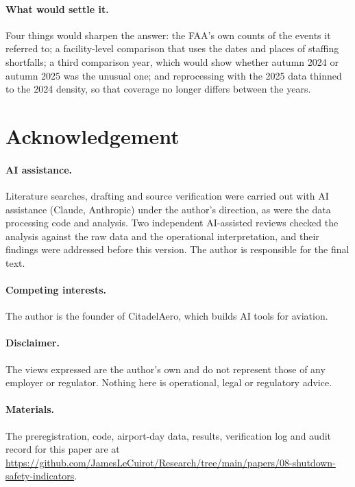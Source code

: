 \documentclass[11pt]{article}
\begin{document}
\paragraph{What would settle it.} Four things would sharpen the answer: the FAA's own counts of the events it referred to; a facility-level comparison that uses the dates and places of staffing shortfalls; a third comparison year, which would show whether autumn 2024 or autumn 2025 was the unusual one; and reprocessing with the 2025 data thinned to the 2024 density, so that coverage no longer differs between the years.

\section*{Acknowledgement}
\paragraph{AI assistance.} Literature searches, drafting and source verification were carried out with AI assistance (Claude, Anthropic) under the author's direction, as were the data processing code and analysis. Two independent AI-assisted reviews checked the analysis against the raw data and the operational interpretation, and their findings were addressed before this version. The author is responsible for the final text.
\paragraph{Competing interests.} The author is the founder of CitadelAero, which builds AI tools for aviation.
\paragraph{Disclaimer.} The views expressed are the author's own and do not represent those of any employer or regulator. Nothing here is operational, legal or regulatory advice.
\paragraph{Materials.} The preregistration, code, airport-day data, results, verification log and audit record for this paper are at \url{https://github.com/JamesLeCuirot/Research/tree/main/papers/08-shutdown-safety-indicators}.



\end{document}
